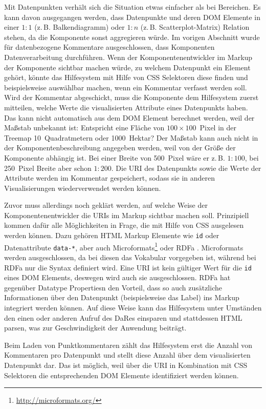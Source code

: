 \documentclass[
	headsepline,
	footsepline,
	fontsize=12pt,
	bibliography=totoc
]{scrbook}
\begin{document}
Mit Datenpunkten verhält sich die Situation etwas einfacher als bei Bereichen. Es kann davon ausgegangen werden, dass Datenpunkte und deren DOM Elemente in einer $1:1$ (z.\,B. Balkendiagramm) oder $1:n$ (z.\,B. Scatterplot-Matrix) Relation stehen, da die Komponente sonst aggregieren würde. Im vorigen Abschnitt wurde für datenbezogene Kommentare ausgeschlossen, dass Komponenten Datenverarbeitung durchführen. Wenn der Komponentenentwickler im Markup der Komponente sichtbar machen würde, zu welchem Datenpunkt ein Element gehört, könnte das Hilfesystem mit Hilfe von CSS Selektoren diese finden und beispielsweise auswählbar machen, wenn ein Kommentar verfasst werden soll. Wird der Kommentar abgeschickt, muss die Komponente dem Hilfesystem zuerst mitteilen, welche Werte die visualisierten Attribute eines Datenpunkts haben. Das kann nicht automatisch aus dem DOM Element berechnet werden, weil der Maßstab unbekannt ist: Entspricht eine Fläche von $100\times100$~Pixel in der Treemap 10~Quadratmetern oder 1000~Hektar? Der Maßstab kann auch nicht in der Komponentenbeschreibung angegeben werden, weil von der Größe der Komponente abhängig ist. Bei einer Breite von 500~Pixel wäre er z.\,B. $1:100$, bei 250~Pixel Breite aber schon $1:200$. Die URI des Datenpunkts sowie die Werte der Attribute werden im Kommentar gespeichert, sodass sie in anderen Visualisierungen wiederverwendet werden können.


Zuvor muss allerdings noch geklärt werden, auf welche Weise der Komponentenentwickler die URIs im Markup sichtbar machen soll. Prinzipiell kommen dafür alle Möglichkeiten in Frage, die mit Hilfe von CSS ausgelesen werden können. Dazu gehören HTML Markup Elemente wie \texttt{id} oder Datenattribute \texttt{data-*}, aber auch Microformats\footnote{\url{http://microformats.org/}} oder RDFa \cite{W3C2012}. Microformats werden ausgeschlossen, da bei diesen das Vokabular vorgegeben ist, während bei RDFa nur die Syntax definiert wird. Eine URI ist kein gültiger Wert für die \texttt{id} eines DOM Elements, deswegen wird auch sie ausgeschlossen. RDFa hat gegenüber Datatype Propertiesn den Vorteil, dass so auch zusätzliche Informationen über den Datenpunkt (beispielsweise das Label) ins Markup integriert werden können. Auf diese Weise kann das Hilfesystem unter Umständen den einen oder anderen Aufruf des DaRes einsparen und stattdessen HTML parsen, was zur Geschwindigkeit der Anwendung beiträgt.

Beim Laden von Punktkommentaren zählt das Hilfesystem erst die Anzahl von Kommentaren pro Datenpunkt und stellt diese Anzahl über dem visualisierten Datenpunkt dar. Das ist möglich, weil über die URI in Kombination mit CSS Selektoren die entsprechenden DOM Elemente identifiziert werden können.
\end{document}
